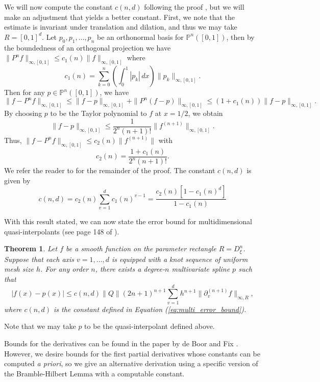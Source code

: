 \documentclass[10pt]{article}
\newtheorem{theorem}{Theorem}[section]
\theoremstyle{definition}
\numberwithin{equation}{section}
\numberwithin{figure}{section}
\numberwithin{table}{section}
\begin{document}
We will now compute the constant $c(n,d)$ following the proof \cite{hollig2013approximation}, but we will make an adjustment that yields a better constant. First, we note that the estimate is invariant under translation and dilation, and thus we may take $R=[0,1]^d$. Let $p_0,p_1,\dots,p_n$ be an orthonormal basis for $\mathbb{P}^n([0,1])$, then by the boundedness of an orthogonal projection we have $\|P^nf\|_{\infty,[0,1]}\leq c_1(n)\|f\|_{\infty,[0,1]}$ where
\begin{equation}
c_1(n)=\sum_{k=0}^n\left(\int_0^1|p_k|\,dx\right)\|p_k\|_{\infty,[0,1]}.
\label{eq:c_1}
\end{equation}
Then for any $p\in \mathbb{P}^n([0,1])$, we have
$$\|f-P^nf\|_{\infty,[0,1]}\leq\|f-p\|_{\infty,[0,1]}+\|P^n(f-p)\|_{\infty,[0,1]}\leq(1+c_1(n))\|f-p\|_{\infty,[0,1]}.$$
By choosing $p$ to be the Taylor polynomial to $f$ at $x=1/2$, we obtain 
$$\|f-p\|_{\infty,[0,1]}\leq \frac{1}{2^n(n+1)!}\|f^{(n+1)}\|_{\infty,[0,1]}.$$
Thus, $\|f-P^nf\|_{\infty,[0,1]}\leq c_2(n)\|f^{(n+1)}\|$ with
\begin{equation}
c_2(n)=\frac{1+c_1(n)}{2^n(n+1)!}.
\label{eq:c_2}
\end{equation}
We refer the reader to \cite{hollig2013approximation} for the remainder of the proof. The constant $c(n,d)$ is given by
\begin{equation}
c(n,d)=c_2(n)\sum_{v=1}^dc_1(n)^{v-1}=\frac{c_2(n)[1-c_1(n)^{d}]}{1-c_1(n)}
\label{eq:multi_error_bound}
\end{equation}

With this result stated, we can now state the error bound for multidimensional quasi-interpolants (see page 148 of \cite{hollig2013approximation}).
\begin{theorem}
\label{thm:quasi_error_higher_dim}
Let $f$ be a smooth function on the parameter rectangle $R=D^n_\xi$. Suppose that each axis $v=1,\dots,d$ is equipped with a knot sequence of uniform mesh size $h$. For any order $n$, there exists a degree-$n$ multivariate spline $p$ such that
$$|f(x)-p(x)|\leq c(n,d)\|Q\|(2n+1)^{n+1}\sum_{v=1}^dh^{n+1}\|\partial_v^{(n+1)}f\|_{\infty,R},$$
where $c(n,d)$ is the constant defined in Equation (\ref{eq:multi_error_bound}). 
\end{theorem}

Note that we may take $p$ to be the quasi-interpolant defined above. %

Bounds for the derivatives can be found in the paper by de Boor and Fix \cite{de1973spline}. However, we desire bounds for the first partial derivatives whose constants can be computed \textit{a priori}, so we give an alternative derivation using a specific version of the Bramble-Hilbert Lemma with a computable constant.
\end{document}
